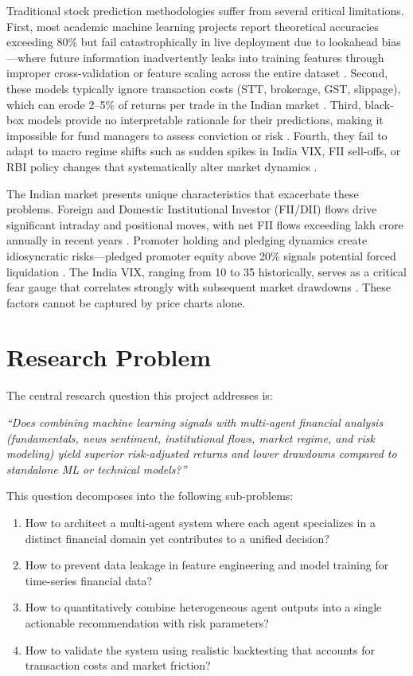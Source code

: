 \documentclass[12pt,a4paper]{report}
\begin{document}
Traditional stock prediction methodologies suffer from several critical limitations. First, most academic machine learning projects report theoretical accuracies exceeding 80\% but fail catastrophically in live deployment due to lookahead bias---where future information inadvertently leaks into training features through improper cross-validation or feature scaling across the entire dataset \cite{lopez2019machine}. Second, these models typically ignore transaction costs (STT, brokerage, GST, slippage), which can erode 2--5\% of returns per trade in the Indian market \cite{sebi2023circular}. Third, black-box models provide no interpretable rationale for their predictions, making it impossible for fund managers to assess conviction or risk \cite{rudin2019stop}. Fourth, they fail to adapt to macro regime shifts such as sudden spikes in India VIX, FII sell-offs, or RBI policy changes that systematically alter market dynamics \cite{baker2019macro}.

The Indian market presents unique characteristics that exacerbate these problems. Foreign and Domestic Institutional Investor (FII/DII) flows drive significant intraday and positional moves, with net FII flows exceeding  lakh crore annually in recent years \cite{nse2024annual}. Promoter holding and pledging dynamics create idiosyncratic risks---pledged promoter equity above 20\% signals potential forced liquidation \cite{sebi2021pledging}. The India VIX, ranging from 10 to 35 historically, serves as a critical fear gauge that correlates strongly with subsequent market drawdowns \cite{bhaduri2020vix}. These factors cannot be captured by price charts alone.

\section{Research Problem}
The central research question this project addresses is:

\begin{center}
    \textit{``Does combining machine learning signals with multi-agent financial analysis (fundamentals, news sentiment, institutional flows, market regime, and risk modeling) yield superior risk-adjusted returns and lower drawdowns compared to standalone ML or technical models?''}
\end{center}

This question decomposes into the following sub-problems:
\begin{enumerate}
    \item How to architect a multi-agent system where each agent specializes in a distinct financial domain yet contributes to a unified decision?
    \item How to prevent data leakage in feature engineering and model training for time-series financial data?
    \item How to quantitatively combine heterogeneous agent outputs into a single actionable recommendation with risk parameters?
    \item How to validate the system using realistic backtesting that accounts for transaction costs and market friction?
\end{enumerate}
\end{document}
